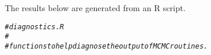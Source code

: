 \documentclass{article}\usepackage[]{graphicx}\usepackage[]{color}
\makeatletter
\newcommand{\hlcom}[1]{\textcolor[rgb]{0.678,0.584,0.686}{\textit{#1}}}%
\newenvironment{kframe}{%
 \def\at@end@of@kframe{}%
 \ifinner\ifhmode%
  \def\at@end@of@kframe{\end{minipage}}%
  \begin{minipage}{\columnwidth}%
 \fi\fi%
 \def\FrameCommand##1{\hskip\@totalleftmargin \hskip-\fboxsep
 \colorbox{shadecolor}{##1}\hskip-\fboxsep
     \hskip-\linewidth \hskip-\@totalleftmargin \hskip\columnwidth}%
 \MakeFramed {\advance\hsize-\width
   \@totalleftmargin\z@ \linewidth\hsize
   \@setminipage}}%
 {\par\unskip\endMakeFramed%
 \at@end@of@kframe}
\newenvironment{knitrout}{}{} %
\makeatother
\begin{document}
\title{\title{\title{\title{\title{\title{\title{}}}}}}}



\maketitle
The results below are generated from an R script.

\begin{knitrout}
\color{fgcolor}\begin{kframe}
\begin{alltt}
\hlcom{# diagnostics.R}
\hlcom{#}
\hlcom{# functions to help diagnose the output of MCMC routines.}
\end{alltt}
\end{kframe}
\end{knitrout}
\end{document}
